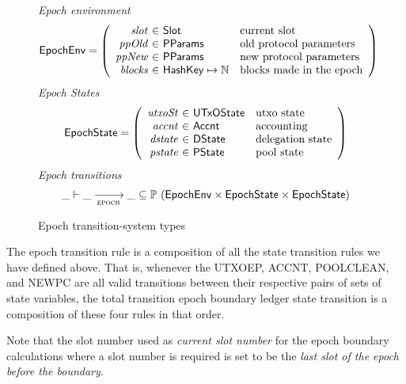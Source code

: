 \begin{figure}[htb]
  \emph{Epoch environment}
  \begin{equation*}
    \EpochEnv =
    \left(
      \begin{array}{r@{~\in~}ll}
        \var{slot} & \Slot & \text{current slot}\\
        \var{ppOld} & \PParams & \text{old protocol parameters}\\
        \var{ppNew} & \PParams & \text{new protocol parameters}\\
        \var{blocks} & \HashKey \mapsto \N & \text{blocks made in the epoch}\\
      \end{array}
    \right)
  \end{equation*}
  \emph{Epoch States}
  \begin{equation*}
    \EpochState =
    \left(
      \begin{array}{r@{~\in~}ll}
        \var{utxoSt} & \UTxOState & \text{utxo state}\\
        \var{accnt} & \Accnt & \text{accounting}\\
        \var{dstate} & \DState & \text{delegation state}\\
        \var{pstate} & \PState & \text{pool state}\\
      \end{array}
    \right)
  \end{equation*}
  \emph{Epoch transitions}
  \begin{equation*}
    \_ \vdash
    \var{\_} \trans{epoch}{} \var{\_}
    \subseteq \powerset (\EpochEnv \times \EpochState \times \EpochState)
  \end{equation*}
  \caption{Epoch transition-system types}
  \label{fig:ts-types:epoch}
\end{figure}


The epoch transition rule is a composition of all the state transition rules
we have defined above. That is, whenever the UTXOEP, ACCNT, POOLCLEAN, and
NEWPC are all valid transitions between their respective pairs of sets of
state variables, the total transition epoch boundary ledger state transition
is a composition of these four rules in that order.

Note that the slot number used as \textit{current slot number}
for the epoch boundary calculations where a slot number is required is set to
be the \textit{last slot of the epoch before the boundary}.

